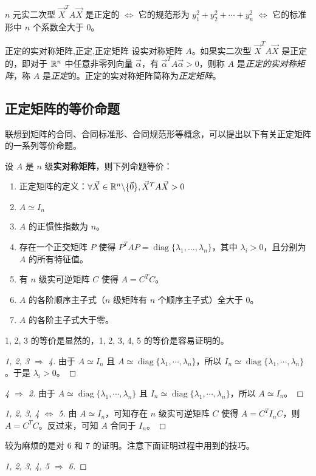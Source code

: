\begin{theorem}
	$n$ 元实二次型 $\vec X^T A \vec X$ 是正定的 $\Longleftrightarrow$ 它的规范形为 $y_1^2 + y_2^2 + \cdots + y_n^2$ $\Longleftrightarrow$ 它的标准形中 $n$ 个系数全大于 $0$。
\end{theorem}

\begin{definition}{正定的实对称矩阵,正定,正定矩阵}
	设实对称矩阵 $A$。如果实二次型 $\vec X^T A \vec X$ 是正定的，即对于 $\mathbb R^n$ 中任意非零列向量 $\vec \alpha$，有 $\vec \alpha^T A \vec \alpha > 0$，则称 $A$ 是\emph{正定的实对称矩阵}，称 $A$ 是\emph{正定}的。正定的实对称矩阵简称为\emph{正定矩阵}。
\end{definition}

\subsection{正定矩阵的等价命题}

联想到矩阵的合同、合同标准形、合同规范形等概念，可以提出以下有关正定矩阵的一系列等价命题。

设 $A$ 是 $n$ 级\textbf{实对称矩阵}，则下列命题等价：

\begin{enumerate}
	\item 正定矩阵的定义：$\forall \vec X \in \mathbb R^n \backslash \{\vec 0\}, \vec X^T A \vec X > 0$
	\item $A \simeq I_n$
	\item $A$ 的正惯性指数为 $n$。
	\item 存在一个正交矩阵 $P$ 使得 $P^T A P = \operatorname{diag}\{ \lambda_1, \ldots, \lambda_n \}$，其中 $\lambda_i > 0$，且分别为 $A$ 的所有特征值。
	\item 有 $n$ 级实可逆矩阵 $C$ 使得 $A = C^T C$。
	\item $A$ 的各阶顺序主子式（$n$ 级矩阵有 $n$ 个顺序主子式）全大于 $0$。
	\item $A$ 的各阶主子式大于零。
\end{enumerate}

1, 2, 3 的等价是显然的，1, 2, 3, 4, 5 的等价是容易证明的。

\begin{proof}[1, 2, 3 $\Longrightarrow$ 4]
	由于 $A \simeq I_n$ 且 $A \simeq \operatorname{diag} \{ \lambda_1, \cdots, \lambda_n \}$，所以 $I_n \simeq \operatorname{diag} \{ \lambda_1, \cdots, \lambda_n \}$。于是 $\lambda_i > 0$。
\end{proof}

\begin{proof}[4 $\Longrightarrow$ 2]
	由于 $A \simeq \operatorname{diag} \{ \lambda_1, \cdots, \lambda_n \}$ 且 $I_n \simeq \operatorname{diag} \{ \lambda_1,  \cdots, \lambda_n \}$，所以 $A \simeq I_n$。
\end{proof}

\begin{proof}[1, 2, 3, 4 $\Longleftrightarrow$ 5]
	由 $A \simeq I_n$，可知存在 $n$ 级实可逆矩阵 $C$ 使得 $A = C^T I_n C$，则 $A = C^T C$。反过来，可知 $A$ 合同于 $I_n$。
\end{proof}

较为麻烦的是对 6 和 7 的证明。注意下面证明过程中用到的技巧。

\begin{proof}[1, 2, 3, 4, 5 $\Longrightarrow$ 6]

\end{proof}

